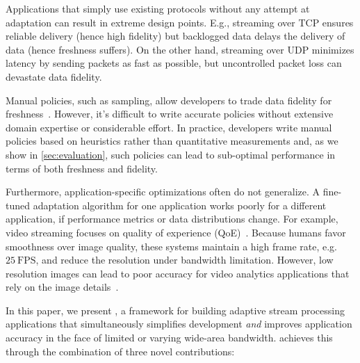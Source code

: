 Applications that simply use existing protocols without any attempt at
adaptation can result in extreme design points. E.g., streaming over TCP ensures
reliable delivery (hence high fidelity) but backlogged data delays the delivery
of data (hence freshness suffers).  On the other hand, streaming over UDP
minimizes latency by sending packets as fast as possible, but uncontrolled
packet loss can devastate data fidelity.

Manual policies, such as sampling, allow developers to trade data fidelity for
freshness~\cite{rabkin2014aggregation}. However, it's difficult to write
accurate policies without extensive domain expertise or considerable effort. In
practice, developers write manual policies based on heuristics rather than
quantitative measurements and, as we show in \autoref{sec:evaluation}, such
policies can lead to sub-optimal performance in terms of both freshness and
fidelity.

Furthermore, application-specific optimizations often do not generalize. A
fine-tuned adaptation algorithm for one application works poorly for a different
application, if performance metrics or data distributions change.  For example,
video streaming focuses on quality of experience
(QoE)~\cite{michalos2012dynamic, pantos2016http, yin2015control}. Because humans
favor smoothness over image quality, these systems maintain a high frame rate,
e.g.\,\(25~\text{FPS}\), and reduce the resolution under bandwidth limitation.
However, low resolution images can lead to poor accuracy for video analytics
applications that rely on the image details~\cite{lowe2004distinctive,
  viola2001rapid}.

In this paper, we present \sysname{}, a framework for building adaptive stream
processing applications that simultaneously simplifies development \emph{and}
improves application accuracy in the face of limited or varying wide-area
bandwidth.
\sysname{} achieves this through the combination of three novel contributions:

